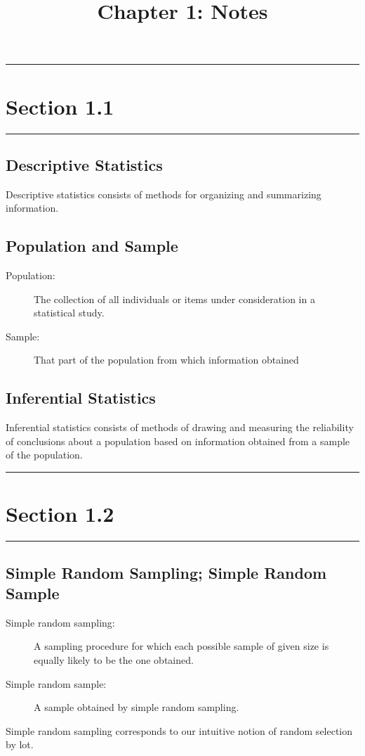 \documentclass[12pt]{article}
\title{Chapter 1: Notes}
\author{}
\begin{document}
    \maketitle

    \noindent\rule{\textwidth}{0.4pt}
    \section*{Section 1.1}
    \noindent\rule{\textwidth}{0.4pt}
        \subsection*{Descriptive Statistics}
            Descriptive statistics consists of methods for organizing and summarizing
            information.
        \subsection*{Population and Sample}
            \begin{description}
                \item[Population:] The collection of all individuals or items under
                consideration in a statistical study. 
                \item[Sample:] That part of the population from which information obtained 
            \end{description}
        \subsection*{Inferential Statistics}
            Inferential statistics consists of methods of drawing and measuring the
            reliability of conclusions about a population based on information obtained
            from a sample of the population.

    \noindent\rule{\textwidth}{0.4pt}
    \section*{Section 1.2}
    \noindent\rule{\textwidth}{0.4pt}
        \subsection*{Simple Random Sampling; Simple Random Sample}
            \begin{description}
                \item[Simple random sampling:] A sampling procedure for which each
                possible sample of given size is equally likely to be the one obtained. 
                \item[Simple random sample:] A sample obtained by simple random sampling.
            \end{description}
        Simple random sampling corresponds to our intuitive notion of random selection
        by lot.
\end{document}
